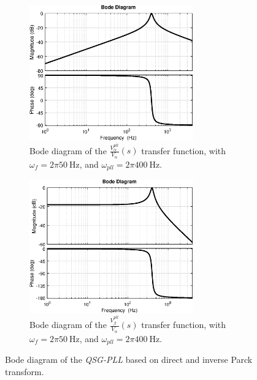 \documentclass[11pt,a4paper,oneside]{book}
\numberwithin{equation}{section}
\theoremstyle{it}
\theoremstyle{definition}
\begin{document}
\begin{figure}[H]
	\centering
	\begin{subfigure}{.5\textwidth}
		\centering
		\includegraphics[width = 200pt, angle = 0,	keepaspectratio]{figures/Hin.eps}
		\captionsetup{width=0.75\textwidth, font=footnotesize}
		\caption{Bode diagram of the $\frac{V_\alpha^{pll}}{V_\alpha}(s)$ transfer function, with $\omega_f=2\pi\SI{50}{\hertz}$, and $\omega_{pll}=2\pi\SI{400}{\hertz}$.}
		\label{}
	\end{subfigure}%
	\begin{subfigure}{.5\textwidth}
		\centering
		\includegraphics[width = 200pt, angle = 0,	keepaspectratio]{figures/Hq.eps}
		\captionsetup{width=0.75\textwidth, font=footnotesize}
		\caption{Bode diagram of the $\frac{V_\beta^{pll}}{V_\alpha}(s)$ transfer function, with $\omega_f=2\pi\SI{50}{\hertz}$, and $\omega_{pll}=2\pi\SI{400}{\hertz}$.}
		\label{}
	\end{subfigure}
	\captionsetup{width=0.5\textwidth, font=small}
	\caption{Bode diagram of the \textit{QSG-PLL} based on direct and inverse Parck transform.}
	\label{}
\end{figure}
\end{document}

